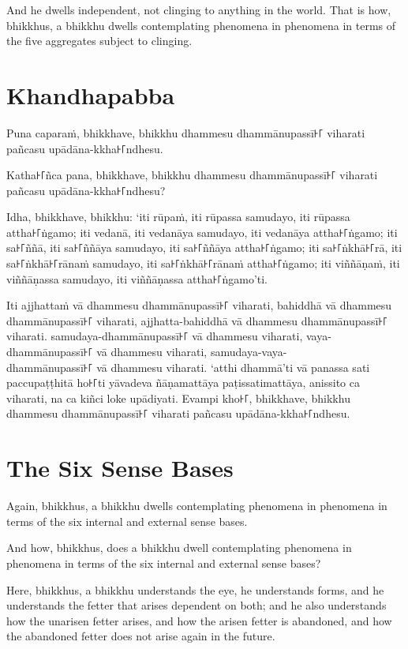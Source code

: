 And he dwells independent, not clinging to anything in the world. That is how,
bhikkhus, a bhikkhu dwells contemplating phenomena in phenomena in terms of the
five aggregates subject to clinging.


\paliPage
\section*{Khandhapabba}

Puna caparaṁ, bhikkhave, bhikkhu dhammesu dhammānupassī꜔꜒ viharati pañcasu
upādāna-kkha꜔꜒ndhesu.

Katha꜔꜒ñca pana, bhikkhave, bhikkhu dhammesu dhammānupassī꜔꜒ viharati pañcasu
upādāna-kkha꜔꜒ndhesu?

Idha, bhikkhave, bhikkhu:
‘iti rūpaṁ, iti rūpassa samudayo, iti rūpassa attha꜔꜒ṅgamo;
iti vedanā, iti vedanāya samudayo, iti vedanāya attha꜔꜒ṅgamo;
iti sa꜔꜒ññā, iti sa꜔꜒ññāya samudayo, iti sa꜔꜒ññāya attha꜔꜒ṅgamo;
iti sa꜔꜒ṅkhā꜔꜒rā, iti sa꜔꜒ṅkhā꜔꜒rānaṁ samudayo, iti sa꜔꜒ṅkhā꜔꜒rānaṁ attha꜔꜒ṅgamo;
iti viññāṇaṁ, iti viññāṇassa samudayo, iti viññāṇassa attha꜔꜒ṅgamo’ti.

Iti ajjhattaṁ vā dhammesu dhammānupassī꜔꜒ viharati,
bahiddhā vā dhammesu dhammānupassī꜔꜒ viharati,
ajjhatta-bahiddhā vā dhammesu dhammānupassī꜔꜒ viharati.
samudaya-dhammānupassī꜔꜒ vā dhammesu viharati,
vaya-dhammānupassī꜔꜒ vā dhammesu viharati,
samudaya-vaya-\\ dhammānupassī꜔꜒ vā dhammesu viharati.
‘atthi dhammā’ti vā panassa sati paccupaṭṭhitā ho꜔꜒ti
yāvadeva ñāṇamattāya paṭissatimattāya, anissito ca viharati,
na ca kiñci loke upādiyati. Evampi kho꜔꜒, bhikkhave, bhikkhu
dhammesu dhammānupassī꜔꜒ viharati pañcasu upādāna-kkha꜔꜒ndhesu.


\englishPage
\section{The Six Sense Bases}

Again, bhikkhus, a bhikkhu dwells contemplating phenomena in phenomena in terms
of the six internal and external sense bases.

And how, bhikkhus, does a bhikkhu dwell contemplating phenomena in phenomena in
terms of the six internal and external sense bases?

Here, bhikkhus, a bhikkhu understands the eye, he understands forms, and he
understands the fetter that arises dependent on both; and he also understands
how the unarisen fetter arises, and how the arisen fetter is abandoned, and how
the abandoned fetter does not arise again in the future.

